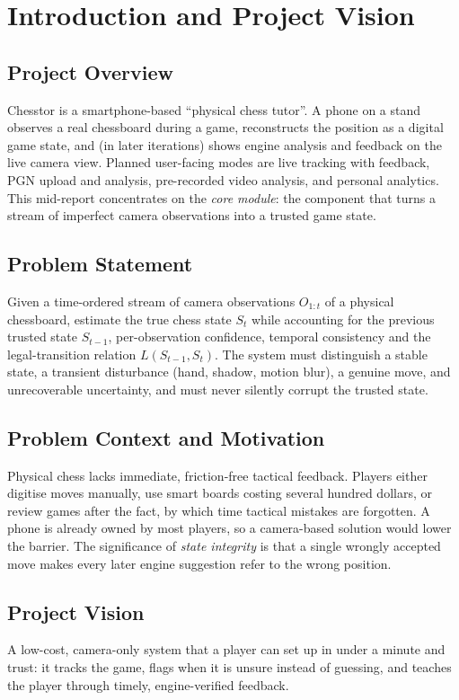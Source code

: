 \chapter{Introduction and Project Vision}
\section{Project Overview}
Chesstor is a smartphone-based ``physical chess tutor''. A phone on a stand observes a real chessboard during a game,
reconstructs the position as a digital game state, and (in later iterations) shows engine analysis and feedback on
the live camera view. Planned user-facing modes are live tracking with feedback, PGN upload and analysis,
pre-recorded video analysis, and personal analytics. This mid-report concentrates on the \emph{core module}: the
component that turns a stream of imperfect camera observations into a trusted game state.

\section{Problem Statement}
Given a time-ordered stream of camera observations $O_{1:t}$ of a physical chessboard, estimate the true chess state
$S_t$ while accounting for the previous trusted state $S_{t-1}$, per-observation confidence, temporal consistency and
the legal-transition relation $L(S_{t-1},S_t)$. The system must distinguish a stable state, a transient disturbance
(hand, shadow, motion blur), a genuine move, and unrecoverable uncertainty, and must never silently corrupt the trusted state.

\section{Problem Context and Motivation}
Physical chess lacks immediate, friction-free tactical feedback. Players either digitise moves manually, use
smart boards costing several hundred dollars, or review games after the fact, by which time tactical mistakes are
forgotten. A phone is already owned by most players, so a camera-based solution would lower the barrier. The
significance of \emph{state integrity} is that a single wrongly accepted move makes every later engine suggestion
refer to the wrong position.

\section{Project Vision}
A low-cost, camera-only system that a player can set up in under a minute and trust: it tracks the game, flags when it
is unsure instead of guessing, and teaches the player through timely, engine-verified feedback.

